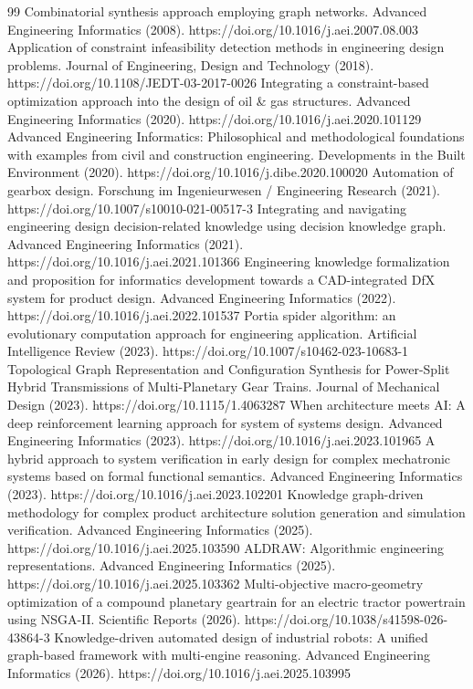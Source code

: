 \documentclass[preprint,12pt]{elsarticle}
\begin{document}
\begin{thebibliography}{99}
Combinatorial synthesis approach employing graph networks. Advanced Engineering Informatics (2008). https://doi.org/10.1016/j.aei.2007.08.003
Application of constraint infeasibility detection methods in engineering design problems. Journal of Engineering, Design and Technology (2018). https://doi.org/10.1108/JEDT-03-2017-0026
Integrating a constraint-based optimization approach into the design of oil \& gas structures. Advanced Engineering Informatics (2020). https://doi.org/10.1016/j.aei.2020.101129
Advanced Engineering Informatics: Philosophical and methodological foundations with examples from civil and construction engineering. Developments in the Built Environment (2020). https://doi.org/10.1016/j.dibe.2020.100020
Automation of gearbox design. Forschung im Ingenieurwesen / Engineering Research (2021). https://doi.org/10.1007/s10010-021-00517-3
Integrating and navigating engineering design decision-related knowledge using decision knowledge graph. Advanced Engineering Informatics (2021). https://doi.org/10.1016/j.aei.2021.101366
Engineering knowledge formalization and proposition for informatics development towards a CAD-integrated DfX system for product design. Advanced Engineering Informatics (2022). https://doi.org/10.1016/j.aei.2022.101537
Portia spider algorithm: an evolutionary computation approach for engineering application. Artificial Intelligence Review (2023). https://doi.org/10.1007/s10462-023-10683-1
Topological Graph Representation and Configuration Synthesis for Power-Split Hybrid Transmissions of Multi-Planetary Gear Trains. Journal of Mechanical Design (2023). https://doi.org/10.1115/1.4063287
When architecture meets AI: A deep reinforcement learning approach for system of systems design. Advanced Engineering Informatics (2023). https://doi.org/10.1016/j.aei.2023.101965
A hybrid approach to system verification in early design for complex mechatronic systems based on formal functional semantics. Advanced Engineering Informatics (2023). https://doi.org/10.1016/j.aei.2023.102201
Knowledge graph-driven methodology for complex product architecture solution generation and simulation verification. Advanced Engineering Informatics (2025). https://doi.org/10.1016/j.aei.2025.103590
ALDRAW: Algorithmic engineering representations. Advanced Engineering Informatics (2025). https://doi.org/10.1016/j.aei.2025.103362
Multi-objective macro-geometry optimization of a compound planetary geartrain for an electric tractor powertrain using NSGA-II. Scientific Reports (2026). https://doi.org/10.1038/s41598-026-43864-3
Knowledge-driven automated design of industrial robots: A unified graph-based framework with multi-engine reasoning. Advanced Engineering Informatics (2026). https://doi.org/10.1016/j.aei.2025.103995
\end{thebibliography}
\end{document}
